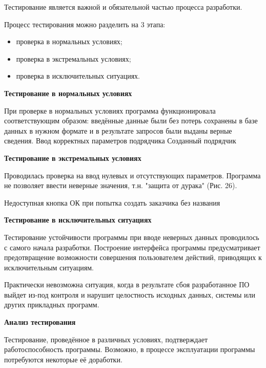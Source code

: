 Тестирование является важной и обязательной частью процесса разработки.

Процесс тестирования можно разделить на 3 этапа:
\begin{itemize}
  \item проверка в нормальных условиях;
  \item проверка в экстремальных условиях;
  \item проверка в исключительных ситуациях.
\end{itemize}

\textbf{Тестирование в нормальных условиях}

При проверке в нормальных условиях программа функционировала соответствующим образом:
введённые данные были без потерь сохранены в базе данных в нужном формате и в результате запросов были выданы верные сведения.
{Ввод корректных параметров подрядчика}
{Созданный подрядчик}

\textbf{Тестирование в экстремальных условиях}

Проводилась проверка на ввод нулевых и отсутствующих параметров. Программа не позволяет ввести неверные значения, т.н.
"защита от дурака" (Рис. 26).

{Недоступная кнопка ОК при попытка создать заказчика без названия}

\textbf{Тестирование в исключительных ситуациях}

Тестирование устойчивости программы при вводе неверных данных проводилось с самого начала разработки.
Построение интерфейса программы предусматривает предотвращение возможности совершения пользователем действий,
приводящих к исключительным ситуациям.

Практически невозможна ситуация, когда в результате сбоя разработанное ПО выйдет из-под контроля и
нарушит целостность исходных данных, системы или других прикладных программ.

\textbf{Анализ тестирования}

Тестирование, проведённое в различных условиях, подтверждает работоспособность программы. Возможно, в процессе эксплуатации программы потребуются некоторые её доработки.
